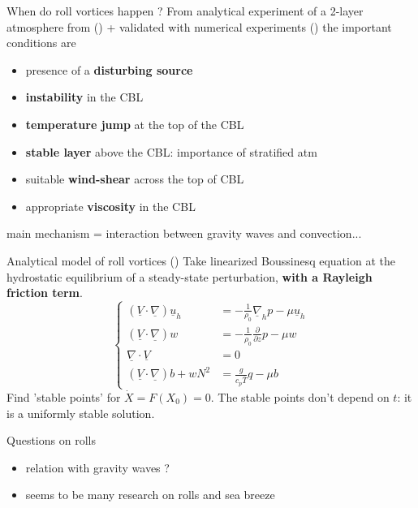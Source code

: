 \begin{frame}{When do roll vortices happen ? }
From analytical experiment of a 2-layer atmosphere from (\cite{liu_analytical_2009}) + validated with numerical experiments (\cite{liu_numerical_2011}) the important conditions are 
\begin{itemize}
    \item presence of a \textbf{disturbing source}
    \item \textbf{instability} in the CBL
    \item \textbf{temperature jump} at the top of the CBL
    \item \textbf{stable layer} above the CBL: importance of stratified atm
    \item suitable \textbf{wind-shear} across the top of CBL
    \item appropriate \textbf{viscosity} in the CBL
\end{itemize}
main mechanism = interaction between gravity waves and convection... 
\end{frame}

\begin{frame}{Analytical model of roll vortices (\cite{liu_analytical_2009})}
Take linearized Boussinesq equation at the hydrostatic equilibrium of a steady-state perturbation, \textbf{with a Rayleigh friction term}. 
\begin{equation}
\label{eq:sys_NS}
\begin{cases}
(\underline V \cdot \underline \nabla )\underline u_h &= - \frac{1}{\rho_0} \underline \nabla_h p - \mu \underline u_h \\
(\underline V \cdot \underline \nabla)w &= - \frac{1}{\rho_0} \frac{\partial}{\partial z}p - \mu w \\
\underline \nabla \cdot \underline V &= 0 \\
(\underline V \cdot \underline  \nabla)b + wN^2 &= \frac{g}{c_p \overline T}q - \mu b
\end{cases}
\end{equation}
Find 'stable points' for $\dot X = F(X_0) = 0$. The stable points don't depend on $t$: it is a uniformly stable solution. 
\end{frame}

\begin{frame}{Questions on rolls}
\begin{itemize}
    \item relation with gravity waves ? 
    \item seems to be many research on rolls and sea breeze
\end{itemize}
\end{frame}


